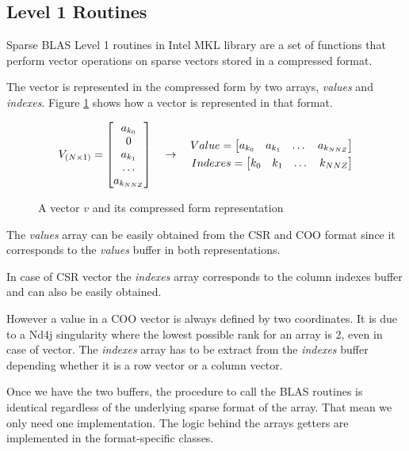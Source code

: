 \subsection{Level 1 Routines}

Sparse BLAS Level 1 routines in Intel MKL library \cite{mkllvl1} are a set of functions that perform vector operations on sparse vectors stored in a compressed format.	

The vector is represented in the compressed form by two arrays, \textit{values} and \textit{indexes}. Figure \ref{fig:compressedVector} shows how a vector is represented in that format.

\begin{figure}[h]
	\[
	\centering
	V_{(N\times 1)} = 
	\begin{bmatrix}
	a_{k_{0}}\\
	0\\
	a_{k_{1}}\\
	\dots\\
	a_{k_{NNZ}}
	\end{bmatrix}
	\quad\rightarrow\quad
	\begin{aligned}
		Value = 
		\begin{bmatrix}
		a_{k_{0}}& a_{{k_{1}}} & \dots & a_{k_{NNZ}}
		\end{bmatrix}\\
		Indexes = 
		\begin{bmatrix}
		k_{0} & k_{1} & \dots & k_{NNZ}		
		\end{bmatrix}
	\end{aligned}
	\]
	\caption{A vector $v$ and its compressed form representation}
	\label{fig:compressedVector}
\end{figure}

The \textit{values} array can be easily obtained from the CSR and COO format since it corresponds to the \textit{values} buffer in both representations.

In case of CSR vector the \textit{indexes} array corresponds to the column indexes buffer and can also be easily obtained.

However a value in a COO vector is always defined by two coordinates. It is due to a Nd4j singularity where the lowest possible rank for an array is 2, even in case of vector. The \textit{indexes} array has to be extract from the \textit{indexes} buffer depending whether it is a row vector or a column vector.

Once we have the two buffers, the procedure to call the BLAS routines is identical regardless of the underlying sparse format of the array. That mean we only need one implementation. The logic behind the arrays getters are implemented in the format-specific classes. 

